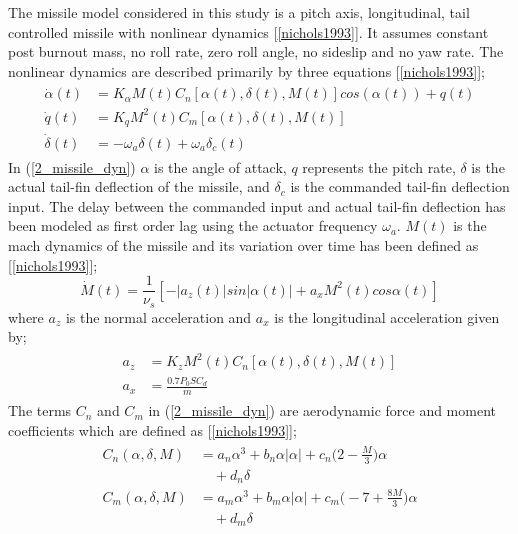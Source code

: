 \documentclass[conference]{IEEEtran}
\begin{document}
	The missile model considered in this study is a pitch axis, longitudinal, tail controlled missile with nonlinear dynamics [\ref{nichols1993}]. It assumes constant post burnout mass, no roll rate, zero roll angle, no sideslip and no yaw rate. The nonlinear dynamics are described primarily by three equations [\ref{nichols1993}]; 
	\begin{eqnarray}
		\begin{aligned}
		\label{2_missile_dyn}
			\dot{\alpha}(t)	&=	K_\alpha M(t) C_n [\alpha(t),\delta(t),M(t)]cos(\alpha(t)) + q(t) \\
			\dot{q}(t)		&=	K_q M^2(t) C_m [\alpha(t),\delta(t),M(t)] \\
			\dot{\delta}(t)	&=	-\omega_a\delta(t) + \omega_a\delta_c(t)
		\end{aligned}
	\end{eqnarray}
	In (\ref{2_missile_dyn}) $\alpha$ is the angle of attack, $q$ represents the pitch rate, $\delta$ is the actual tail-fin deflection of the missile, and $\delta_c$ is the commanded tail-fin deflection input. The delay between the commanded input and actual tail-fin deflection has been modeled as first order lag using the actuator frequency $\omega_a$. $M(t)$ is the mach dynamics of the missile and its variation over time has been defined as [\ref{nichols1993}];
	\begin{equation}
	\label{mach_dyn}
		\dot{M}(t)=\frac{1}{\nu_s}[-|a_z(t)|sin|\alpha(t)|+a_xM^2(t)cos\alpha(t)]
	\end{equation}
	where $a_z$ is the normal acceleration and $a_x$ is the longitudinal acceleration given by;	
	\begin{eqnarray}
		\begin{aligned}
		a_z &= K_z M^2(t)C_n[\alpha(t),\delta(t),M(t)]\\
		a_x &= \frac{0.7P_0SC_d}{m}
		\end{aligned}
	\end{eqnarray}
	The terms $C_n$ and $C_m$ in (\ref{2_missile_dyn}) are aerodynamic force and moment coefficients which are defined as [\ref{nichols1993}];
	\begin{eqnarray}
		\begin{aligned}
		 \label{cncm}
			C_n(\alpha,\delta,M)&=a_n\alpha^3+b_n\alpha|\alpha|+c_n\Big(2-\frac{M}{3}\Big)\alpha \\ 
			&\quad+ d_n\delta \\
			C_m(\alpha,\delta,M)&=a_m\alpha^3+b_m\alpha|\alpha|+ c_m\Big(-7+\frac{8M}{3}\Big) \alpha 
			\\&\quad+d_m \delta
		\end{aligned}
	\end{eqnarray} 
\end{document}

